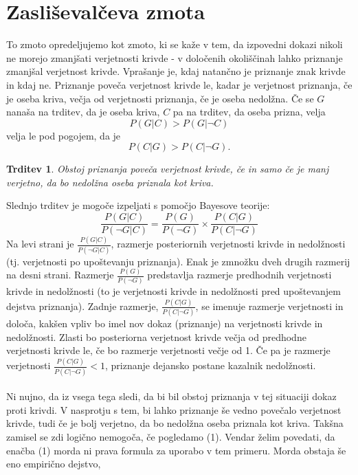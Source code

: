 \documentclass[12pt,a4paper]{amsart}
\theoremstyle{definition} %
\theoremstyle{plain} %
\newtheorem{trditev}[definicija]{Trditev}
\begin{document}
\section{Zasliševalčeva zmota}
To zmoto opredeljujemo kot zmoto, ki se kaže v tem, da izpovedni dokazi nikoli ne morejo zmanjšati verjetnosti krivde - v določenih okoliščinah 
lahko priznanje zmanjšal verjetnost krivde. Vprašanje je, kdaj natančno je priznanje znak krivde in kdaj ne. Priznanje poveča verjetnost krivde 
le, kadar je verjetnost priznanja, če je oseba kriva, večja od verjetnosti priznanja, če je oseba nedolžna. Če se $G$ nanaša na trditev, da je 
oseba kriva, $C$ pa na trditev, da oseba prizna, velja
\[
    P(G \lvert C) > P(G \lvert \neg C)
\]  
velja le pod pogojem, da je 
\[
    P(C \lvert G) > P(C \lvert \neg G).
\] 
\begin{trditev}
    Obstoj priznanja poveča verjetnost krivde, če in samo če je manj verjetno, da bo nedolžna oseba priznala kot kriva.
\end{trditev}
Slednjo trditev je mogoče izpeljati s pomočjo Bayesove teorije:
\begin{equation}
    \frac{P(G \lvert C)}{P(\neg G \lvert C)} = \frac{P(G)}{P(\neg G)}  \times \frac{P(C \lvert G)}{P(C \lvert \neg G)}
\end{equation}
Na levi strani je $\frac{P(G \lvert C)}{P(\neg G \lvert C)}$, razmerje posteriornih verjetnosti krivde in nedolžnosti (tj. verjetnosti po 
upoštevanju priznanja). Enak je zmnožku dveh drugih razmerij na desni strani. Razmerje $\frac{P(G)}{P(\neg G)}$ predstavlja razmerje predhodnih 
verjetnosti krivde in nedolžnosti (to je verjetnosti krivde in nedolžnosti pred upoštevanjem dejstva priznanja). Zadnje razmerje, 
$\frac{P(C \lvert G)}{P(C \lvert \neg G)}$, se imenuje razmerje verjetnosti in določa, kakšen vpliv bo imel nov dokaz (priznanje) na 
verjetnosti krivde in nedolžnosti. Zlasti bo posteriorna verjetnost krivde večja od predhodne verjetnosti krivde le, če bo razmerje verjetnosti 
večje od 1. Če pa je razmerje verjetnosti $\frac{P(C \lvert G)}{P(C \lvert \neg G)} < 1$, priznanje dejansko postane kazalnik nedolžnosti. \\\\
Ni nujno, da iz vsega tega sledi, da bi bil obstoj priznanja v tej situaciji dokaz proti krivdi. V nasprotju s tem, bi lahko priznanje še vedno 
povečalo verjetnost krivde, tudi če je bolj verjetno, da bo nedolžna oseba priznala kot kriva. Takšna zamisel se zdi logično nemogoča, če 
pogledamo (1). Vendar želim povedati, da enačba (1) morda ni prava formula za uporabo v tem primeru. Morda obstaja še eno empirično dejstvo, 
\end{document}

